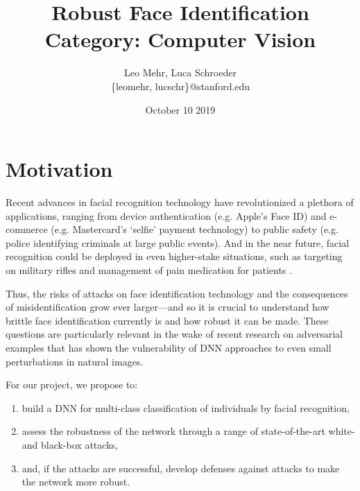 \documentclass{article}
\title{Robust Face Identification \\ Category: Computer Vision}
\author{Leo Mehr, Luca Schroeder \\ \{leomehr, lucschr\}@stanford.edu}
\date{October 10 2019}
\begin{document}
\maketitle

\section{Motivation}

Recent advances in facial recognition technology have revolutionized a plethora of applications, ranging from device authentication (e.g. Apple's Face ID) and e-commerce (e.g. Mastercard's `selfie' payment technology) to public safety (e.g. police identifying criminals at large public events). And in the near future, facial recognition could be deployed in even higher-stake situations, such as targeting on military rifles \cite{rifle} and management of pain medication for patients \cite{painmed}.

Thus, the risks of attacks on face identification technology and the consequences of misidentification grow ever larger---and so it is crucial to understand how brittle face identification currently is and how robust it can be made. These questions are particularly relevant in the wake of recent research on adversarial examples that has shown the vulnerability of DNN approaches to even small perturbations in natural images.


For our project, we propose to:
\begin{enumerate}
    \item build a DNN for multi-class classification of individuals by facial recognition,
    \item assess the robustness of the network through a range of state-of-the-art white- and black-box attacks,
    \item and, if the attacks are successful, develop defenses against attacks to make the network more robust.
\end{enumerate}
\end{document}
